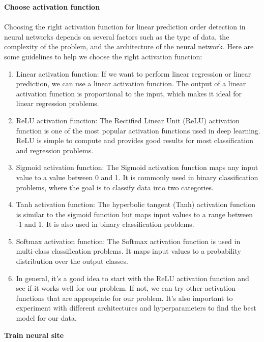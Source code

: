         \textbf{Choose activation function}\\
        \\
        Choosing the right activation function for linear prediction order detection in neural networks depends on
        several factors such as the type of data, the complexity of the problem, and the architecture of the neural
        network. Here are some guidelines to help we choose the right activation function:
        \begin{enumerate}
            \item Linear activation function: If we want to perform linear regression or linear prediction, we can
            use a linear activation function. The output of a linear activation function is proportional to the input,
            which makes it ideal for linear regression problems.
            \item ReLU activation function: The Rectified Linear Unit (ReLU) activation function is one of the most
            popular activation functions used in deep learning. ReLU is simple to compute and provides good results
            for most classification and regression problems.
            \item Sigmoid activation function: The Sigmoid activation function maps any input value to a value
            between 0 and 1. It is commonly used in binary classification problems, where the goal is to classify
            data into two categories.
            \item Tanh activation function: The hyperbolic tangent (Tanh) activation function is similar to the sigmoid
            function but maps input values to a range between -1 and 1. It is also used in binary classification problems.
            \item Softmax activation function: The Softmax activation function is used in multi-class classification
            problems. It maps input values to a probability distribution over the output classes.
            \item In general, it's a good idea to start with the ReLU activation function and see if it works well
            for our problem. If not, we can try other activation functions that are appropriate for our problem.
            It's also important to experiment with different architectures and hyperparameters to find the
            best model for our data.
        \end{enumerate}
        \textbf{Train neural site}\\
        \\
